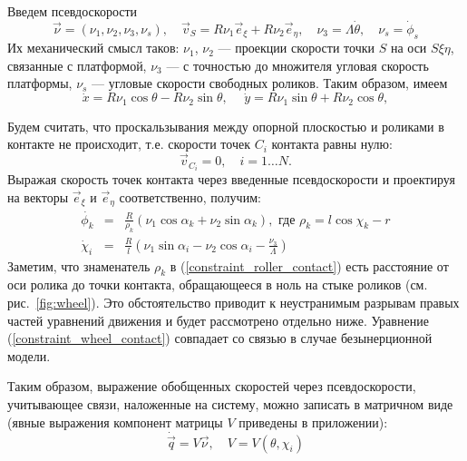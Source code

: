 Введем псевдоскорости
$$\vec{\nu} = (\nu_1, \nu_2, \nu_3, \nu_s), \quad \vec{v}_S = R\nu_1\vec{e}_\xi + R\nu_2\vec{e}_\eta, \quad \nu_3 = \Lambda\dot{\theta},\quad \nu_s = \dot{\phi}_s$$
Их механический смысл таков: $\nu_1$, $\nu_2$ --- проекции скорости точки $S$ на оси $S\xi\eta$, связанные с платформой, $\nu_3$ --- с точностью до множителя угловая скорость платформы, $\nu_s$ --- угловые скорости свободных роликов. Таким образом, имеем
$$ \dot{x} = R \nu_1\cos\theta-R\nu_2\sin\theta, \hspace{15pt} \dot{y} = R\nu_1\sin\theta+R\nu_2\cos\theta,$$

Будем считать, что проскальзывания между опорной плоскостью и роликами в контакте не происходит, т.е.
скорости точек $C_i$ контакта равны нулю:
$$\vec{v}_{C_i} = 0,\quad i = 1\dots N.$$
Выражая скорость точек контакта через введенные псевдоскорости и проектируя на векторы $\vec{e}_\xi$ и $\vec{e}_\eta$ соответственно, получим:
\begin{eqnarray}
\dot{\phi_k} &=& \frac{R}{\rho_k }(\nu_1\cos\alpha_k + \nu_2\sin\alpha_k),\text{ где } \rho_k  = l\cos\chi_k - r \label{constraint_roller_contact}\\
\dot{\chi}_i &=& \frac{R}{l}(\nu_1\sin\alpha_i - \nu_2\cos\alpha_i - \frac{\nu_3}{\Lambda})\label{constraint_wheel_contact}
\end{eqnarray}
Заметим, что знаменатель $\rho_k$ в (\ref{constraint_roller_contact}) есть расстояние от оси ролика до точки контакта, обращающееся в ноль на стыке роликов (см. рис.~\ref{fig:wheel}). Это обстоятельство приводит к неустранимым разрывам правых частей уравнений движения и будет рассмотрено отдельно ниже.
Уравнение (\ref{constraint_wheel_contact}) совпадает со связью в случае безынерционной модели. 

Таким образом, выражение обобщенных скоростей через псевдоскорости, учитывающее связи, наложенные на систему, можно записать в матричном виде (явные выражения компонент матрицы $V$ приведены в приложении):
\begin{equation}
    \dot{\vec{q}} = V\vec{\nu},\quad V = V(\theta,\chi_i)
\end{equation}
